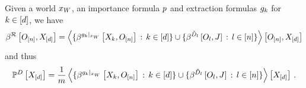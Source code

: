 \begin{theorem}
    \label{the:extractionrelationDecomposition}
    Given a \firstOrderLogic{} world $x_{W}$, an importance formula $p$ and extraction formulas $g_{k}$ for $k\in[d]$, we have
    \begin{align*}
        \beta^{\mathcal{R}}\left[O_{[n]},X_{[d]}\right] =
        \left\langle 
            \{\beta^{{g_{k}}|_{x_{W}}}\left[X_{k},O_{[n]}\right] \, : \, k\in[d]\}
            \cup \{\beta^{\tilde{D}_{l}}\left[O_{l},J\right] \, : \, l\in[n]\}
        \right\rangle \left[ O_{[n]},X_{[d]} \right]
    \end{align*}
    and thus
    \begin{align*}
        \mathbb{P}^{D}\left[X_{[d]}\right] =
        \frac{1}{m}  \left\langle 
            \{\beta^{{g_{k}}|_{x_{W}}}\left[X_{k},O_{[n]}\right] \, : \, k\in[d]\}
            \cup \{\beta^{\tilde{D}_{l}}\left[O_{l},J\right] \, : \, l\in[n]\}
        \right\rangle \left[ X_{[d]} \right] \, .
    \end{align*}
\end{theorem}
